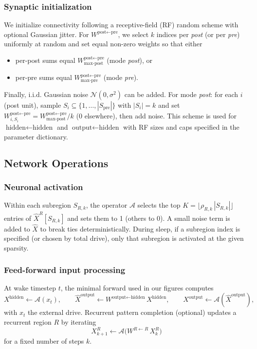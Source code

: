 \documentclass{article}
\begin{document}
\subsubsection*{Synaptic initialization}
We initialize connectivity following a receptive-field (RF) random scheme with optional Gaussian jitter. For $W^{\textrm{post}\leftarrow\textrm{pre}}$, we select $k$ indices per \emph{post} (or per \emph{pre}) uniformly at random and set equal non-zero weights so that either
\begin{itemize}
  \item per-post sums equal $W^{\textrm{post}\leftarrow\textrm{pre}}_{\text{max-post}}$ (mode \emph{post}), or
  \item per-pre sums equal $W^{\textrm{post}\leftarrow\textrm{pre}}_{\text{max-pre}}$ (mode \emph{pre}).
\end{itemize}
Finally, i.i.d. Gaussian noise $\mathcal{N}(0,\sigma^2)$ can be added. For mode \emph{post}: for each $i$ (post unit), sample $S_i \subseteq \{1,\dots,|S_{\textrm{pre}}|\}$ with $|S_i|=k$ and set $W^{\textrm{post}\leftarrow\textrm{pre}}_{i,S_i} = W^{\textrm{post}\leftarrow\textrm{pre}}_{\text{max-post}}/k$ (0 elsewhere), then add noise. This scheme is used for $\text{hidden}\leftarrow\text{hidden}$ and $\text{output}\leftarrow\text{hidden}$ with RF sizes and caps specified in the parameter dictionary.

\subsection*{Network Operations}
\subsubsection*{Neuronal activation}
Within each subregion $S_{R,k}$, the operator $\mathcal{A}$ selects the top $K=\lfloor\rho_{R,k}\,|S_{R,k}|\rfloor$ entries of $\hat{X}^R[S_{R,k}]$ and sets them to 1 (others to 0). A small noise term is added to $\hat{X}$ to break ties deterministically. During sleep, if a subregion index is specified (or chosen by total drive), only that subregion is activated at the given sparsity.

\subsubsection*{Feed-forward input processing}
At wake timestep $t$, the minimal forward used in our figures computes
\begin{equation}
    X^{\text{hidden}} \leftarrow \mathcal{A}(x_t),\qquad
    \hat{X}^{\text{output}} \leftarrow W^{\text{output}\leftarrow\text{hidden}}\,X^{\text{hidden}},\qquad
    X^{\text{output}} \leftarrow \mathcal{A}(\hat{X}^{\text{output}}),
\end{equation}
with $x_t$ the external drive. Recurrent pattern completion (optional) updates a recurrent region $R$ by iterating
\begin{equation}
    X^{R}_{k+1} \leftarrow \mathcal{A}\bigl(W^{R\leftarrow R}\,X^{R}_{k}\bigr)
\end{equation}
for a fixed number of steps $k$.
\end{document}
